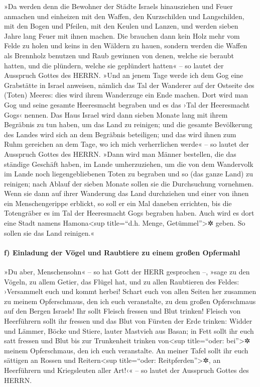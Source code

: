 »Da werden denn die Bewohner der Städte Israels
hinausziehen und Feuer anmachen und einheizen mit den Waffen, den
Kurzschilden und Langschilden, mit den Bogen und Pfeilen, mit den Keulen
und Lanzen, und werden sieben Jahre lang Feuer mit ihnen machen.
Die brauchen dann kein Holz mehr vom Felde zu holen und
keins in den Wäldern zu hauen, sondern werden die Waffen als Brennholz
benutzen und Raub gewinnen von denen, welche sie beraubt hatten, und die
plündern, welche sie geplündert hatten« -- so lautet der Ausspruch
Gottes des HERRN. »Und an jenem Tage werde ich dem Gog
eine Grabstätte in Israel anweisen, nämlich das Tal der Wanderer auf der
Ostseite des (Toten) Meeres: dies wird ihrem Wanderzuge ein Ende machen.
Dort wird man Gog und seine gesamte Heeresmacht begraben und es das ›Tal
der Heeresmacht Gogs‹ nennen. Das Haus Israel wird dann
sieben Monate lang mit ihrem Begräbnis zu tun haben, um das Land zu
reinigen; und die gesamte Bevölkerung des Landes wird
sich an dem Begräbnis beteiligen; und das wird ihnen zum Ruhm gereichen
an dem Tage, wo ich mich verherrlichen werde« -- so lautet der Ausspruch
Gottes des HERRN. »Dann wird man Männer bestellen, die
das ständige Geschäft haben, im Lande umherzuziehen, um die von dem
Wandervolk im Lande noch liegengebliebenen Toten zu begraben und so (das
ganze Land) zu reinigen; nach Ablauf der sieben Monate sollen sie die
Durchsuchung vornehmen. Wenn sie dann auf ihrer Wanderung
das Land durchziehen und einer von ihnen ein Menschengerippe erblickt,
so soll er ein Mal daneben errichten, bis die Totengräber es im Tal der
Heeresmacht Gogs begraben haben. Auch wird es dort eine
Stadt namens Hamona\textless sup title=``d.h. Menge,
Getümmel''\textgreater✲ geben. So sollen sie das Land reinigen.«

\hypertarget{f-einladung-der-vuxf6gel-und-raubtiere-zu-einem-grouxdfen-opfermahl}{%
\paragraph{f) Einladung der Vögel und Raubtiere zu einem großen
Opfermahl}\label{f-einladung-der-vuxf6gel-und-raubtiere-zu-einem-grouxdfen-opfermahl}}

»Du aber, Menschensohn« -- so hat Gott der HERR
gesprochen --, »sage zu den Vögeln, zu allem Getier, das Flügel hat, und
zu allen Raubtieren des Feldes: ›Versammelt euch und kommt herbei!
Schart euch von allen Seiten her zusammen zu meinem Opferschmaus, den
ich euch veranstalte, zu dem großen Opferschmaus auf den Bergen Israels!
Ihr sollt Fleisch fressen und Blut trinken! Fleisch von
Heerführern sollt ihr fressen und das Blut von Fürsten der Erde trinken:
Widder und Lämmer, Böcke und Stiere, lauter Mastvieh aus Basan;
in Fett sollt ihr euch satt fressen und Blut bis zur
Trunkenheit trinken von\textless sup title=``oder: bei''\textgreater✲
meinem Opferschmaus, den ich euch veranstalte. An meiner
Tafel sollt ihr euch sättigen an Rossen und Reitern\textless sup
title=``oder: Reitpferden''\textgreater✲, an Heerführern und
Kriegsleuten aller Art!‹« -- so lautet der Ausspruch Gottes des HERRN.

